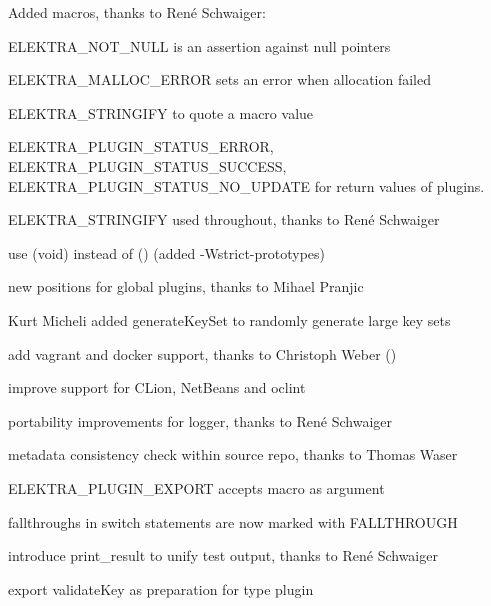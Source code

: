\begin{DoxyItemize}
\item Added macros, thanks to René Schwaiger\+:
\begin{DoxyItemize}
\item {\ttfamily E\+L\+E\+K\+T\+R\+A\+\_\+\+N\+O\+T\+\_\+\+N\+U\+LL} is an assertion against null pointers
\item {\ttfamily E\+L\+E\+K\+T\+R\+A\+\_\+\+M\+A\+L\+L\+O\+C\+\_\+\+E\+R\+R\+OR} sets an error when allocation failed
\item {\ttfamily E\+L\+E\+K\+T\+R\+A\+\_\+\+S\+T\+R\+I\+N\+G\+I\+FY} to quote a macro value
\item {\ttfamily E\+L\+E\+K\+T\+R\+A\+\_\+\+P\+L\+U\+G\+I\+N\+\_\+\+S\+T\+A\+T\+U\+S\+\_\+\+E\+R\+R\+OR}, {\ttfamily E\+L\+E\+K\+T\+R\+A\+\_\+\+P\+L\+U\+G\+I\+N\+\_\+\+S\+T\+A\+T\+U\+S\+\_\+\+S\+U\+C\+C\+E\+SS}, {\ttfamily E\+L\+E\+K\+T\+R\+A\+\_\+\+P\+L\+U\+G\+I\+N\+\_\+\+S\+T\+A\+T\+U\+S\+\_\+\+N\+O\+\_\+\+U\+P\+D\+A\+TE} for return values of plugins.
\end{DoxyItemize}
\item {\ttfamily E\+L\+E\+K\+T\+R\+A\+\_\+\+S\+T\+R\+I\+N\+G\+I\+FY} used throughout, thanks to René Schwaiger
\item use {\ttfamily (void)} instead of {\ttfamily ()} (added {\ttfamily -\/\+Wstrict-\/prototypes})
\item new positions for global plugins, thanks to Mihael Pranjic
\item Kurt Micheli added {\ttfamily generate\+Key\+Set} to randomly generate large key sets
\item add vagrant and docker support, thanks to Christoph Weber ()
\item improve support for C\+Lion, Net\+Beans and {\ttfamily oclint}
\item portability improvements for logger, thanks to René Schwaiger
\item metadata consistency check within source repo, thanks to Thomas Waser
\item {\ttfamily E\+L\+E\+K\+T\+R\+A\+\_\+\+P\+L\+U\+G\+I\+N\+\_\+\+E\+X\+P\+O\+RT} accepts macro as argument
\item fallthroughs in switch statements are now marked with {\ttfamily F\+A\+L\+L\+T\+H\+R\+O\+U\+GH}
\item introduce {\ttfamily print\+\_\+result} to unify test output, thanks to René Schwaiger
\item export {\ttfamily validate\+Key} as preparation for type plugin
\end{DoxyItemize}

